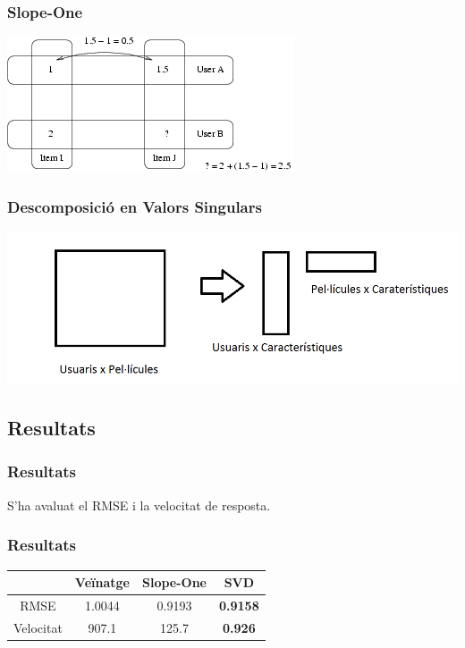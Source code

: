 \documentclass[catalan]{beamer}
\begin{document}
\begin{frame}
\frametitle{Slope-One}
\begin{center}
\includegraphics{figs/slope-one}
\end{center}
\end{frame}

\begin{frame}
\frametitle{Descomposició en Valors Singulars}
\begin{center}
\includegraphics[width=\textwidth]{figs/svd}
\end{center}
\end{frame}

\subsection{Resultats}
\begin{frame}
\frametitle{Resultats}
S'ha avaluat el RMSE i la velocitat de resposta.
\end{frame}

\begin{frame}
\frametitle{Resultats}
\begin{center}
\begin{tabular}{|c|c|c|c|}\hline
		& Veïnatge	& Slope-One	& SVD 		\\ \hline
RMSE		& 1.0044	& 0.9193	& \textbf{0.9158}	\\
Velocitat	& 907.1	& 125.7	& \textbf{0.926}	\\ \hline
\end{tabular}
\end{center}
\end{frame}
\end{document}
